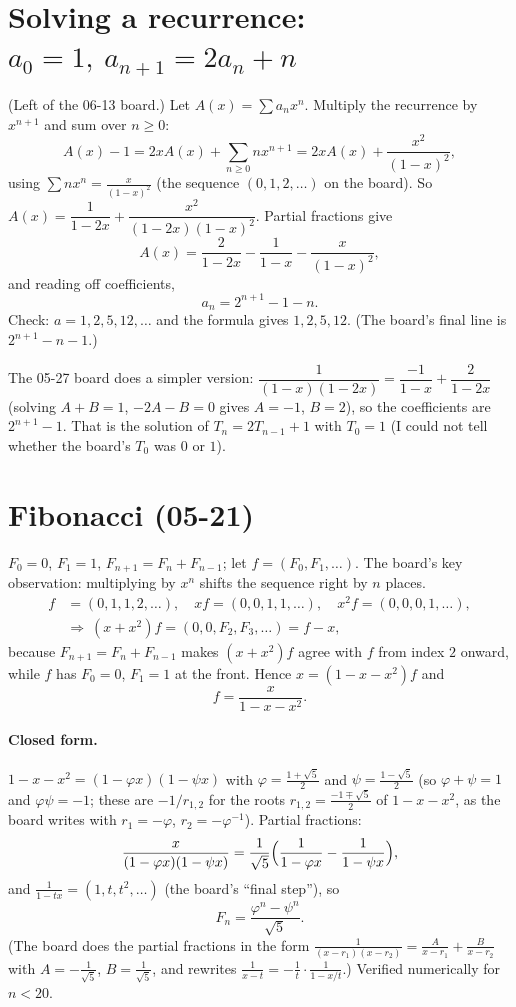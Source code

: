 \documentclass[11pt]{article}
\begin{document}
\section{Solving a recurrence: $a_0=1,\ a_{n+1}=2a_n+n$}

(Left of the 06-13 board.) Let $A(x)=\sum a_nx^n$. Multiply the recurrence by $x^{n+1}$ and sum over $n\ge0$:
\[
A(x)-1=2xA(x)+\sum_{n\ge0}nx^{n+1}=2xA(x)+\frac{x^2}{(1-x)^2},
\]
using $\sum nx^n=\frac{x}{(1-x)^2}$ (the sequence $(0,1,2,\dots)$ on the board). So $A(x)=\dfrac1{1-2x}+\dfrac{x^2}{(1-2x)(1-x)^2}$. Partial fractions give
\[
A(x)=\frac2{1-2x}-\frac1{1-x}-\frac x{(1-x)^2},
\]
and reading off coefficients,
\[
a_n=2^{n+1}-1-n.
\]
Check: $a=1,2,5,12,\dots$ and the formula gives $1,2,5,12$. (The board's final line is $2^{n+1}-n-1$.)

The 05-27 board does a simpler version: $\dfrac1{(1-x)(1-2x)}=\dfrac{-1}{1-x}+\dfrac2{1-2x}$ (solving $A+B=1$, $-2A-B=0$ gives $A=-1$, $B=2$), so the coefficients are $2^{n+1}-1$. That is the solution of $T_n=2T_{n-1}+1$ with $T_0=1$ (I could not tell whether the board's $T_0$ was $0$ or $1$).

\section{Fibonacci (05-21)}

$F_0=0$, $F_1=1$, $F_{n+1}=F_n+F_{n-1}$; let $f=(F_0,F_1,\dots)$. The board's key observation: multiplying by $x^n$ shifts the sequence right by $n$ places.
\begin{align*}
f&=(0,1,1,2,\dots),\quad xf=(0,0,1,1,\dots),\quad x^2f=(0,0,0,1,\dots),\\
&\Rightarrow\ (x+x^2)f=(0,0,F_2,F_3,\dots)=f-x,
\end{align*}
because $F_{n+1}=F_n+F_{n-1}$ makes $(x+x^2)f$ agree with $f$ from index $2$ onward, while $f$ has $F_0=0$, $F_1=1$ at the front. Hence $x=(1-x-x^2)f$ and
\[
\boxed{f=\frac{x}{1-x-x^2}}.
\]

\paragraph{Closed form.} $1-x-x^2=(1-\varphi x)(1-\psi x)$ with $\varphi=\frac{1+\sqrt5}2$ and $\psi=\frac{1-\sqrt5}2$ (so $\varphi+\psi=1$ and $\varphi\psi=-1$; these are $-1/r_{1,2}$ for the roots $r_{1,2}=\frac{-1\mp\sqrt5}2$ of $1-x-x^2$, as the board writes with $r_1=-\varphi$, $r_2=-\varphi^{-1}$). Partial fractions:
\[
\frac x{(1-\varphi x)(1-\psi x)}=\frac1{\sqrt5}\Bigl(\frac1{1-\varphi x}-\frac1{1-\psi x}\Bigr),
\]
and $\frac1{1-tx}=(1,t,t^2,\dots)$ (the board's ``final step''), so
\[
\boxed{F_n=\frac{\varphi^n-\psi^n}{\sqrt5}}.
\]
(The board does the partial fractions in the form $\frac{1}{(x-r_1)(x-r_2)}=\frac{A}{x-r_1}+\frac B{x-r_2}$ with $A=-\frac1{\sqrt5}$, $B=\frac1{\sqrt5}$, and rewrites $\frac1{x-t}=-\frac1t\cdot\frac1{1-x/t}$.) Verified numerically for $n<20$.
\end{document}
